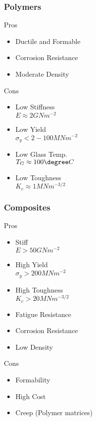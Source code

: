 \subsubsection{Polymers}
\begin{multicols*}{2}
Pros
\begin{itemize}[leftmargin=.5cm]
  \item Ductile and Formable
  \item Corrosion Resistance
  \item Moderate Density
\end{itemize}
\vfill\null
\columnbreak
Cons
\begin{itemize}[leftmargin=.5cm]
  \item Low Stiffness \\ $E \approx 2 GNm^{-2}$
  \item Low Yield \\ $\sigma_y < 2-100 MNm^{-2}$
  \item Low Glass Temp. \\ $T_G \approx 100\degree C$
  \item Low Toughness \\ $K_c \approx 1 MNm^{-3/2}$
\end{itemize}

\end{multicols*}

\subsubsection{Composites}
\begin{multicols*}{2}
Pros
\begin{itemize}[leftmargin=.5cm]
  \item Stiff \\ $E > 50 GNm^{-2}$
  \item High Yield \\ $\sigma_y > 200 MNm^{-2}$
  \item High Toughness \\ $K_c > 20 MNm^{-3/2}$
  \item Fatigue Resistance
  \item Corrosion Resistance
  \item Low Density
\end{itemize}
\vfill\null
\columnbreak
Cons
\begin{itemize}[leftmargin=.5cm]
  \item Formability
  \item High Cost
  \item Creep (Polymer matrices)
\end{itemize}
\end{multicols*}


